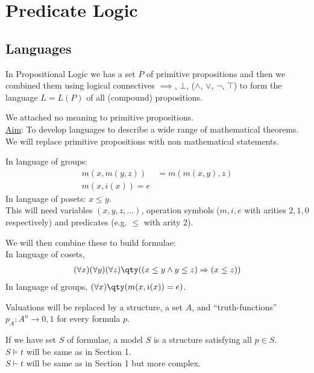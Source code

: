 \section{Predicate Logic}
\subsection{Languages}
In Propositional Logic we has a set $P$ of primitive propositions and then we combined them using logical connectives $\implies$, $\bot$, ($\wedge$, $\vee$, $\neg$, $\top$) to form the language $L = L(P)$ of all (compound) propositions.

We attached no meaning to primitive propositions. \\
\underline{Aim}: To develop languages to describe a wide range of mathematical theorems.
We will replace primitive propositions with non mathematical statements.

\begin{example}
    In language of groups:
    \begin{align*}
        m(x, m(y, z)) &= m(m(x, y), z) \\
        m(x, i(x)) = e
    \end{align*}
    In language of posets: $x \leq y$. \\
    This will need variables $(x, y, z, \dots)$, operation symbols  ($m, i, e$ with arities $2, 1, 0$ respectively) and predicates (e.g. $\leq$ with arity $2$).

    We will then combine these to build formulae: \\
    In language of cosets,
    \begin{align*}
        (\forall x) (\forall y) (\forall z) \qty( (x \leq y \wedge y \leq z) \implies (x \leq z) )
    \end{align*}
    In language of groups, $(\forall x) \qty( m(x, i(x)) = e)$.

    Valuations will be replaced by a structure, a set $A$, and ``truth-functions'' $p_A : A^n \to {0, 1}$ for every formula $p$.

    If we have set $S$ of formulae, a model $S$ is a structure satisfying all $p \in S$. \\
    $S \models t$ will be same as in Section 1. \\
    $S \vdash t$ will be same as in Section 1 but more complex.
\end{example}


